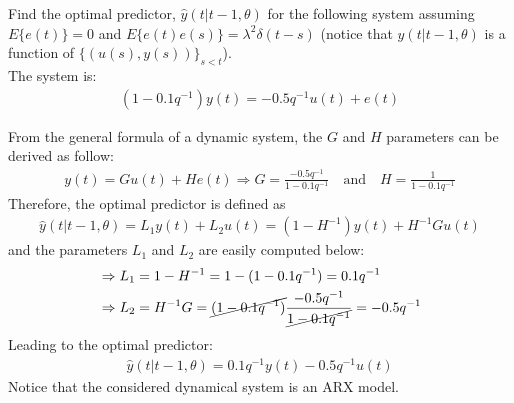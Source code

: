 \Exercise[number={2}]
Find the optimal predictor, \(\hat{y}(t|t-1,\theta)\) for the following
system assuming \(E\{e(t)\}=0\) and \(E\{e(t)e(s)\}=\lambda^2\delta(t-s)\)
(notice that \(y(t|t-1,\theta)\) is a function of \(\{(u(s),y(s))\}_{s<t}\)).\\
The system is:
\begin{align*}
    (1-0.1q^{-1})y(t)=-0.5q^{-1}u(t)+e(t)
\end{align*}

\Answer[number={2}]
From the general formula of a dynamic system, the \(G\) and \(H\)
parameters can be derived as follow:
\begin{align*}
    y(t)=Gu(t)+He(t)
    \Rightarrow
    G=\frac{-0.5q^{-1}}{1-0.1q^{-1}} \quad\text{and}\quad H=\frac{1}{1-0.1q^{-1}}
\end{align*}
Therefore, the optimal predictor is defined as
\begin{align*}
    \hat{y}(t|t-1,\theta) = L_1y(t)+L_2u(t) = (1-H^{-1})y(t)+H^{-1}Gu(t)
\end{align*}
and the parameters \(L_1\) and \(L_2\) are easily computed below:
\begin{align*}
    &\Rightarrow
    L_1 = 1-H^{-1} = 1-(1-0.1q^{-1}) = 0.1q^{-1}\\
    &\Rightarrow
    L_2 = H^{-1}G = \cancel{(1-0.1q^{-1})}\frac{-0.5q^{-1}}{\cancel{1-0.1q^{-1}}}=-0.5q^{-1}
\end{align*}
Leading to the optimal predictor:
\begin{align*}
    \hat{y}(t|t-1,\theta) = 0.1q^{-1}y(t)-0.5q^{-1}u(t)
\end{align*}
Notice that the considered dynamical system is an ARX model.